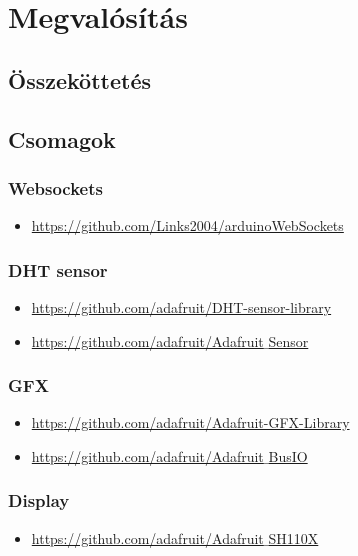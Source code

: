 ﻿\section{Megvalósítás}

\subsection{Összeköttetés}

\subsection{Csomagok}
\subsubsection*{Websockets}
\begin{itemize}
    \item \href{https://github.com/Links2004/arduinoWebSockets}{https://github.com/Links2004/arduinoWebSockets}
\end{itemize}

\subsubsection*{DHT sensor}
\begin{itemize}
    \item \href{https://github.com/adafruit/DHT-sensor-library}{https://github.com/adafruit/DHT-sensor-library}
    \item \href{https://github.com/adafruit/Adafruit_Sensor}{https://github.com/adafruit/Adafruit$\_$Sensor}
\end{itemize}

\subsubsection*{GFX}
\begin{itemize}
    \item \href{https://github.com/adafruit/Adafruit-GFX-Library}{https://github.com/adafruit/Adafruit-GFX-Library}
    \item \href{https://github.com/adafruit/Adafruit_BusIO}{https://github.com/adafruit/Adafruit$\_$BusIO}
\end{itemize}

\subsubsection*{Display}
\begin{itemize}
    \item \href{https://github.com/adafruit/Adafruit_SH110X}{https://github.com/adafruit/Adafruit$\_$SH110X}
\end{itemize}

